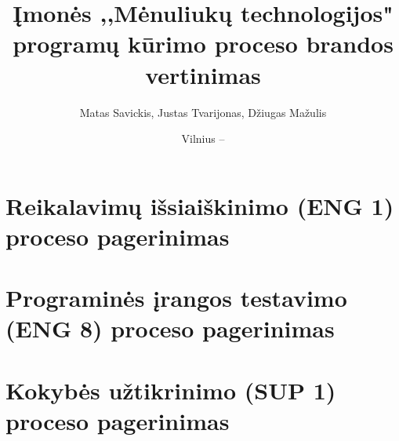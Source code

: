 \documentclass{VUMIFPSkursinis}
\title{Įmonės ,,Mėnuliukų technologijos" programų kūrimo proceso brandos vertinimas}
\author{Matas Savickis, Justas Tvarijonas, Džiugas Mažulis}
\date{Vilnius – \the\year}
\begin{document}
\maketitle

\tableofcontents


\section{Reikalavimų išsiaiškinimo (ENG 1) proceso pagerinimas}
\section{Programinės įrangos testavimo (ENG 8) proceso pagerinimas}	
\section{Kokybės užtikrinimo (SUP 1) proceso pagerinimas}
\end{document}
